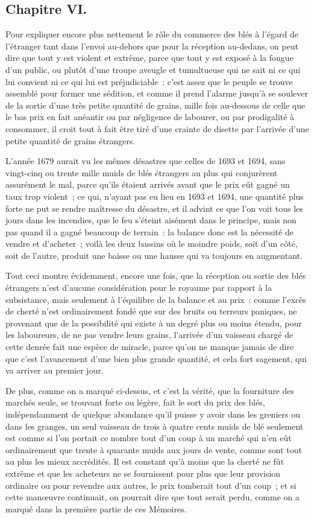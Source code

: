 \documentclass[french,twoside]{book} %
\begin{document}
\subsection[{Chapitre VI.}]{Chapitre VI.}
\noindent Pour expliquer encore plus nettement le rôle du commerce des blés à l’égard de l’étranger tant dans l’envoi au-dehors que pour la réception au-dedans, on peut dire que tout y est violent et extrême, parce que tout y est exposé à la fougue d’un public, ou plutôt d’une troupe aveugle et tumultueuse qui ne sait ni ce qui lui convient ni ce qui lui est préjudiciable : c’est assez que le peuple se trouve assemblé pour former une sédition, et comme il prend l’alarme jusqu’à se soulever de la sortie d’une très petite quantité de grains, mille fois au-dessous de celle que le bas prix en fait anéantir ou par négligence de labourer, ou par prodigalité à consommer, il croit tout à fait être tiré d’une crainte de disette par l’arrivée d’une petite quantité de grains étrangers.\par
L’année 1679 aurait vu les mêmes désastres que celles de 1693 et 1694, sans vingt-cinq ou trente mille muids de blés étrangers au plus qui conjurèrent assurément le mal, parce qu’ils étaient arrivés avant que le prix eût gagné un taux trop violent ; ce qui, n’ayant pas eu lieu en 1693 et 1694, une quantité plus forte ne put se rendre maîtresse du désastre, et il advint ce que l’on voit tous les jours dans les incendies, que le feu s’éteint aisément dans le principe, mais non pas quand il a gagné beaucoup de terrain : la balance donc est la nécessité de vendre et d’acheter ; voilà les deux bassins où le moindre poids, soit d’un côté, soit de l’autre, produit une baisse ou une hausse qui va toujours en augmentant.\par
Tout ceci montre évidemment, encore une fois, que la réception ou sortie des blés étrangers n’est d’aucune considération pour le royaume par rapport à la subsistance, mais seulement à l’équilibre de la balance et au prix : comme l’excès de cherté n’est ordinairement fondé que sur des bruits ou terreurs paniques, ne provenant que de la possibilité qui existe à un degré plus ou moins étendu, pour les laboureurs, de ne pas vendre leurs grains, l’arrivée d’un vaisseau chargé de cette denrée fait une espèce de miracle, parce qu’on ne manque jamais de dire que c’est l’avancement d’une bien plus grande quantité, et cela fort sagement, qui va arriver au premier jour.\par
De plus, comme on a marqué ci-dessus, et c’est la vérité, que la fourniture des marchés seule, se trouvant forte ou légère, fait le sort du prix des blés, indépendamment de quelque abondance qu’il puisse y avoir dans les greniers ou dans les granges, un seul vaisseau de trois à quatre cents muids de blé seulement est comme si l’on portait ce nombre tout d’un coup à un marché qui n’en eût ordinairement que trente à quarante muids aux jours de vente, comme sont tout au plus les mieux accrédités. Il est constant qu’à moins que la cherté ne fût extrême et que les acheteurs ne se fournissent pour plus que leur provision ordinaire ou pour revendre aux autres, le prix tomberait tout d’un coup ; et si cette manœuvre continuait, on pourrait dire que tout serait perdu, comme on a marqué dans la première partie de ces Mémoires.\par
\end{document}
